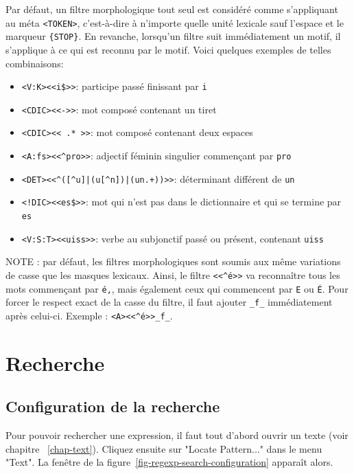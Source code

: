 \noindent Par défaut, un filtre morphologique tout seul est considéré comme s’appliquant au méta
\verb$<TOKEN>$, c’est-à-dire à n’importe quelle unité lexicale sauf l’espace et le marqueur
\verb+{STOP}+.
En revanche, lorsqu’un filtre suit immédiatement un motif, il s’applique à ce qui est reconnu par
le motif. Voici quelques exemples de telles combinaisons:


\begin{itemize}
  \item \verb+<V:K><<i$>>+: participe passé finissant par \verb$i$
  \item \verb!<CDIC><<->>!: mot composé contenant un tiret
  \item \verb!<CDIC><< .* >>!: mot composé contenant deux espaces
  \item \verb!<A:fs><<^pro>>!: adjectif féminin singulier commençant par \verb$pro$
  \item \verb!<DET><<^([^u]|(u[^n])|(un.+))>>!: déterminant différent de \verb$un$
  \item \verb+<!DIC><<es$>>+: mot qui n’est pas dans le dictionnaire et qui se termine par \verb$es$
  \item \verb!<V:S:T><<uiss>>!: verbe au subjonctif passé ou présent, contenant \verb$uiss$
\end{itemize}

\noindent {}NOTE : par défaut, les filtres morphologiques sont soumis aux
même variations de casse que les masques lexicaux. Ainsi, le filtre \verb$<<^é>>$ va reconnaître
tous les mots commençant par \texttt{é,}, mais également ceux qui commencent par \texttt{E} ou 
\texttt{É}. 
Pour forcer le respect exact de la casse du filtre, il faut ajouter \verb+_f_+ immédiatement après
celui-ci. Exemple : \verb+<A><<^é>>_f_+.



\section{Recherche}
\subsection{Configuration de la recherche}
\label{section-configuration-recherche}
Pour pouvoir rechercher une expression, il faut tout d’abord ouvrir un texte (voir chapitre
~\ref{chap-text}). Cliquez ensuite sur "Locate Pattern..." dans le menu "Text". La fenêtre de la
figure~\ref{fig-regexp-search-configuration} apparaît alors.

